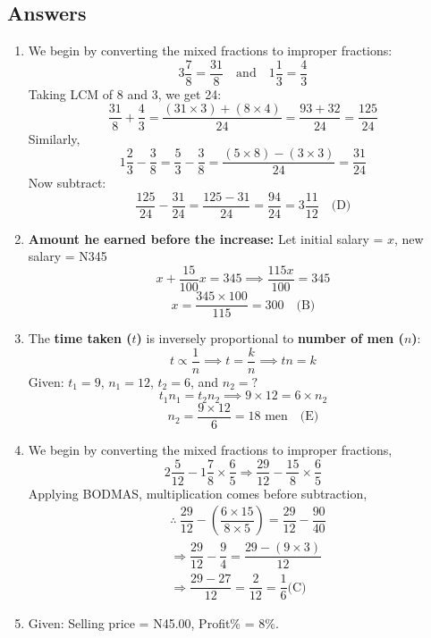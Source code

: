\subsection{Answers}
\begin{multicols}{2}
\begin{enumerate}[label={\arabic*.}]
\item We begin by converting the mixed fractions to improper fractions:
    \[3\frac{7}{8} = \frac{31}{8} \quad \text{and} \quad 1\frac{1}{3} = \frac{4}{3}\]
    Taking LCM of 8 and 3, we get 24:
    \[\frac{31}{8} + \frac{4}{3} = \frac{(31 \times 3) + (8 \times 4)}{24} = \frac{93 + 32}{24} = \frac{125}{24}\]
    Similarly,
    \[1\frac{2}{3} - \frac{3}{8} = \frac{5}{3} - \frac{3}{8} = \frac{(5 \times 8) - (3 \times 3)}{24} = \frac{31}{24}\]
    Now subtract:
    \[\frac{125}{24} - \frac{31}{24} = \frac{125 - 31}{24} = \frac{94}{24} = 3\frac{11}{12} \quad \text{(D)}\]

\item \textbf{Amount he earned before the increase:}
    Let initial salary = $x$, new salary = N345
    \[x + \frac{15}{100}x = 345 \implies \frac{115x}{100} = 345\]
    \[x = \frac{345 \times 100}{115} = 300 \quad \text{(B)}\]

\item The \textbf{time taken ($t$)} is inversely proportional to \textbf{number of men ($n$)}:
    \[t \propto \frac{1}{n} \implies t = \frac{k}{n} \implies tn = k\]
    Given: $t_1 = 9$, $n_1 = 12$, $t_2 = 6$, and $n_2 = ?$
    \[t_1n_1 = t_2n_2 \implies 9 \times 12 = 6 \times n_2\]
    \[n_2 = \frac{9 \times 12}{6} = 18 \text{ men} \quad \text{(E)}\]

\item We begin by converting the mixed fractions to improper fractions,
    \[2\frac{5}{12} - 1\frac{7}{8} \times \frac{6}{5} \Rightarrow \frac{29}{12} - \frac{15}{8} \times \frac{6}{5}\]
    Applying BODMAS, multiplication comes before subtraction,
    \begin{align*}
    &\therefore \ \dfrac{29}{12} - \left(\dfrac{{6}\times{15}}{{8} \times {5}}\right) =\dfrac{29}{12} - \dfrac{90}{40}  \\
    &\Rightarrow \dfrac{29}{12} - \dfrac{9}{4} = \dfrac{29 - (9 \times 3)}{12} \\
    &\Rightarrow \dfrac{29 - 27}{12} = \dfrac{2}{12} = \dfrac{1}{6} \text{(C)} 
    \end{align*}
    
\item Given: Selling price = N45.00, Profit\% = 8\%. 


\end{enumerate}
\end{multicols}
